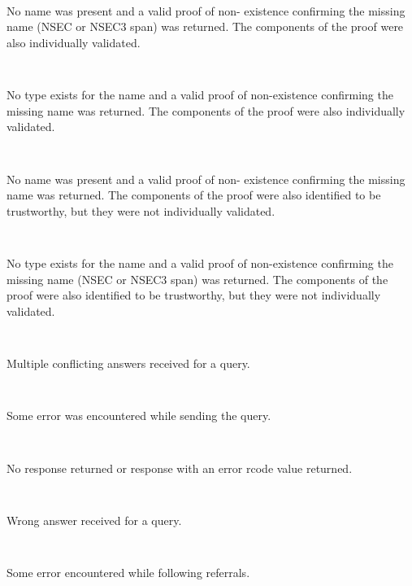 \begin{description}
\begin{description}
\begin{description}
\item {}\verb" "

No name was present and a valid proof of non-
existence confirming the missing name (NSEC
or NSEC3 span) was returned. The components of
the proof were also individually validated.

\item {}\verb" "

No type exists for the name and a valid proof
of non-existence confirming the missing name was
returned.  The components of the proof were also
individually validated.

\item {}\verb" "

No name was present and a valid proof of non-
existence confirming the missing name was returned.
The components of the proof were also identified
to be trustworthy, but they were not individually
validated.

\item {}\verb" "

No type exists for the name and a valid proof
of non-existence confirming the missing name (NSEC
or NSEC3 span) was returned.  The components of the
proof were also identified to be trustworthy, but
they were not individually validated.

\item {}\verb" "

Multiple conflicting answers received for a query.

\item {}\verb" "

Some error was encountered while sending the query.

\item {}\verb" "

No response returned or response with an error
rcode value returned.

\item {}\verb" "

Wrong answer received for a query.

\item {}\verb" "

Some error encountered while following referrals.

\item {}\verb" "


\end{description}
\end{description}
\end{description}
